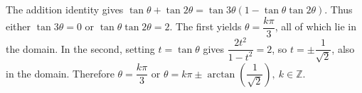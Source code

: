 The addition identity gives $\tan\theta+\tan2\theta=\tan3\theta(1-\tan\theta\tan2\theta)$. Thus either $\tan3\theta=0$ or $\tan\theta\tan2\theta=2$. The first yields $\theta = \dfrac{k \pi}{3}$, all of which lie in the domain. In the second, setting $t=\tan\theta$ gives $\dfrac{2 t^2}{1-t^2} = 2$, so $t = \pm \dfrac{1}{\sqrt{2}}$, also in the domain. Therefore $\boxed{\theta = \dfrac{k \pi}{3} \text{ or } \theta = k \pi \pm \arctan (\dfrac{1}{\sqrt{2}}) , \  k \in \mathbb{Z}}$.
